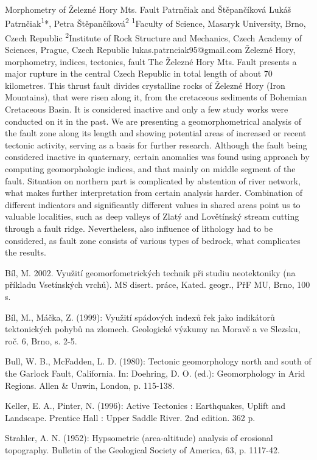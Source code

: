 \abstract
{Morphometry of Železné Hory Mts. Fault} 
{Patrnčiak and Štěpančíková} 
{Lukáš Patrnčiak\textsuperscript{1}*, Petra Štěpančíková\textsuperscript{2}} 
{\POtag} 
{
	\textsuperscript{1}Faculty of Science, Masaryk University, Brno, Czech Republic
	\textsuperscript{2}Institute of Rock Structure and Mechanics, Czech Academy of Sciences, Prague, Czech Republic
}
{lukas.patrnciak95@gmail.com}  %
{Železné Hory, morphometry, indices, tectonics, fault}
{
The Železné Hory Mts. Fault presents a major rupture in the central Czech Republic in total length of about 70 kilometres. This thrust fault divides crystalline rocks of Železné Hory (Iron Mountains), that were risen along it, from the cretaceous sediments of Bohemian Cretaceous Basin. It is considered inactive and only a few study works were conducted on it in the past. We are presenting a geomorphometrical analysis of the fault zone along its length and showing potential areas of increased or recent tectonic activity, serving as a basis for further research. Although the fault being considered inactive in quaternary, certain anomalies was found using approach by computing geomorphologic indices, and that mainly on middle segment of the fault. Situation on northern part is complicated by abstention of river network, what makes further interpretation from certain analysis harder. Combination of different indicators and significantly different values in shared areas point us to valuable localities, such as deep valleys of Zlatý and Lovětínský stream cutting through a fault ridge. Nevertheless, also influence of lithology had to be considered, as fault zone consists of various types of bedrock, what complicates the results.
}
{
Bíl, M. 2002. Využití geomorfometrických technik při studiu neotektoniky (na příkladu Vsetínských vrchů). MS disert. práce, Kated. geogr., PřF MU, Brno, 100 s. 

Bíl, M., Máčka, Z. (1999): Využití spádových indexů řek jako indikátorů tektonických pohybů na zlomech. Geologické výzkumy na Moravě a ve Slezsku, roč. 6, Brno, s. 2-5.

Bull, W. B., McFadden, L. D. (1980): Tectonic geomorphology north and south of the Garlock Fault, California. In: Doehring, D. O. (ed.): Geomorphology in Arid Regions. Allen \& Unwin, London, p. 115-138.

Keller, E. A., Pinter, N. (1996): Active Tectonics : Earthquakes, Uplift and Landscape. Prentice Hall : Upper Saddle River. 2nd edition. 362 p.

Strahler, A. N. (1952): Hypsometric (area-altitude) analysis of erosional topography. Bulletin of the Geological Society of America, 63, p. 1117-42.
}


